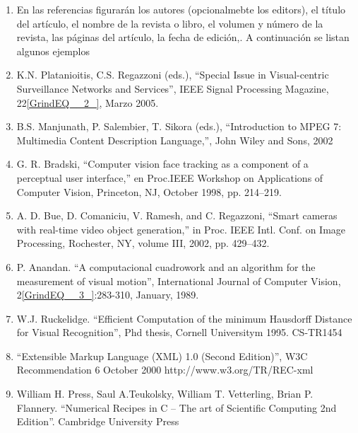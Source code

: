 \documentclass{article} %
\begin{document}
\begin{enumerate}
\item  En las referencias figurar\'{a}n los autores (opcionalmebte los editors), el t\'{i}tulo del art\'{i}culo, el nombre de la revista o libro, el volumen y n\'{u}mero de la revista, las p\'{a}ginas del art\'{i}culo, la fecha de edici\'{o}n,. A continuaci\'{o}n se listan algunos ejemplos

\item  K.N. Platanioitis, C.S. Regazzoni (eds.), ``Special Issue in Visual-centric Surveillance Networks and Services'', IEEE Signal Processing Magazine, 22\eqref{GrindEQ__2_}, Marzo 2005.

\item  B.S. Manjunath, P. Salembier, T. Sikora (eds.), ``Introduction to MPEG 7: Multimedia Content Description Language,'', John Wiley and Sons, 2002

\item  G. R. Bradski, ``Computer vision face tracking as a component of a perceptual user interface,'' en Proc.IEEE Workshop on Applications of Computer Vision, Princeton, NJ, October 1998, pp. 214--219.

\item  A. D. Bue, D. Comaniciu, V. Ramesh, and C. Regazzoni, ``Smart cameras with real-time video object generation,'' in Proc. IEEE Intl. Conf. on Image Processing, Rochester, NY, volume III, 2002, pp. 429--432.

\item  P. Anandan. ``A computacional cuadrowork and an algorithm for the measurement of visual motion'', International Journal of Computer Vision, 2\eqref{GrindEQ__3_}:283-310, January, 1989.

\item  W.J. Ruckelidge. ``Efficient Computation of the minimum Hausdorff Distance for Visual Recognition'', Phd thesis, Cornell Universitym 1995. CS-TR1454

\item  ``Extensible Markup Language (XML) 1.0 (Second Edition)'', W3C Recommendation 6 October 2000 http://www.w3.org/TR/REC-xml\textbf{}

\item \textbf{ }William H. Press, Saul A.Teukolsky, William T. Vetterling, Brian P. Flannery. ``Numerical Recipes in C -- The art of Scientific Computing 2nd Edition''. Cambridge University Press\textbf{}
\end{enumerate}

\noindent 

\noindent 
\end{document}
